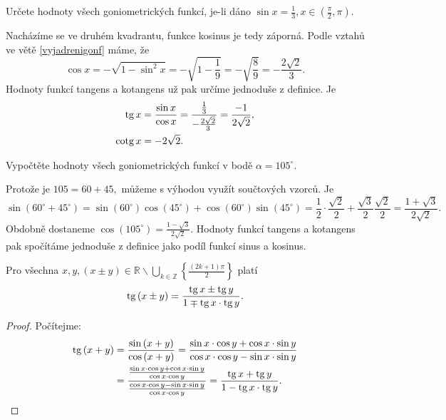 \begin{priklad}
Určete hodnoty všech goniometrických funkcí, je-li dáno $\sin x=\frac{1}{3}, x \in \left ( \frac{\pi}{2},\pi \right ). $
\end{priklad}

\begin{reseni}
Nacházíme se ve druhém kvadrantu, funkce kosinus je tedy záporná. Podle vztahů ve větě \ref{vyjadrenigonf} máme, že
$$
    \cos x = -\sqrt{1-\sin^2 x} = -\sqrt{1-\frac{1}{9}} = -\sqrt{\frac{8}{9}} = -\frac{2 \sqrt{2}}{3}.
$$
Hodnoty funkcí tangens a kotangens už pak určíme jednoduše z definice. Je
\begin{align*}
\operatorname{tg} x &= \frac{\sin x }{\cos x} = \frac{\frac{1}{3}}{-\frac{2 \sqrt{2}}{3}} = \frac{-1}{2 \sqrt{2}},\\
\operatorname{cotg} x &= -2 \sqrt{2}.
\end{align*}
\end{reseni}

\begin{priklad}
Vypočtěte hodnoty všech goniometrických funkcí v bodě $\alpha = 105^\circ$.
\end{priklad}

\begin{reseni}
Protože je $105=60+45,$ můžeme s výhodou využít součtových vzorců. Je
$$
    \sin (60^\circ + 45 ^ \circ) = \sin (60^\circ) \cos(45 ^ \circ) + \cos (60^\circ) \sin(45 ^ \circ ) = \frac{1}{2} \cdot \frac{\sqrt{2}}{2} + \frac{\sqrt{3}}{2} \frac{\sqrt{2}}{2} = \frac{1+\sqrt{3}}{2 \sqrt{2}}.
$$
Obdobně dostaneme  $\cos (105^\circ) = \frac{1-\sqrt{3}}{2 \sqrt{2}}$. Hodnoty funkcí tangens a kotangens
pak spočítáme jednoduše z definice jako podíl funkcí sinus a kosinus.
\end{reseni}

\begin{veta}
  Pro všechna $x,y, (x\pm y)\in\mathbb{R}\smallsetminus\bigcup\limits_{k\in\mathbb{Z}} \left\{\frac{(2k+1)\pi}{2}\right\}$ platí
  $$\operatorname{tg}\left(x\pm y\right) = \frac{\operatorname{tg} x \pm \operatorname{tg} y}{1\mp\operatorname{tg} x \cdot \operatorname{tg} y}.$$
\end{veta}
\begin{proof}
    Počítejme:
    \begin{align*}
        \operatorname{tg} \left(x+y\right) & = \frac{\sin \left(x+y\right)}{\cos \left(x+y\right)}=\frac{\sin x\cdot  \cos y + \cos x\cdot  \sin y}{\cos x \cdot \cos y - \sin x\cdot  \sin y} \\
        & = \frac{\frac{\sin x \cdot \cos y + \cos x\cdot  \sin y}{\cos x \cdot \cos y}}{\frac{\cos x\cdot  \cos y - \sin x \cdot \sin y}{\cos x\cdot  \cos y}}=\frac{\operatorname{tg} x + \operatorname{tg} y}{1-\operatorname{tg} x \cdot \operatorname{tg} y}.\qedhere
    \end{align*}
\end{proof}


